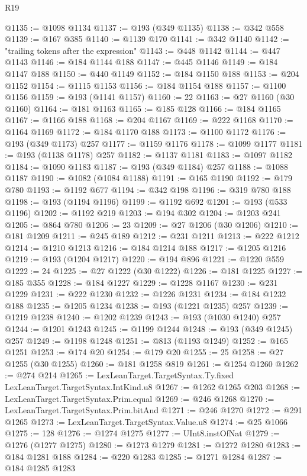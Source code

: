 \begin{lexlean}{R19}
\begin{coremodule}
@1135 := @1098 @1134
@1137 := @193 (@349 @1135)
@1138 := @342 @558
@1139 := @167 @385
@1140 := @1139 @170
@1141 := @342 @1140
@1142 := "trailing tokens after the expression"
@1143 := @448 @1142
@1144 := @447 @1143
@1146 := @184 @1144 @188
@1147 := @445 @1146
@1149 := @184 @1147 @188
@1150 := @440 @1149
@1152 := @184 @1150 @188
@1153 := @204 @1152
@1154 := @1115 @1153
@1156 := @184 @1154 @188
@1157 := @1100 @1156
@1159 := @193 (@1141 @1157)
@1160 := 22
@1163 := @27 @1160 (@30 @1160)
@1164 := @181 @1163
@1165 := @185 @128
@1166 := @184 @1165
@1167 := @1166 @188
@1168 := @204 @1167
@1169 := @222 @1168
@1170 := @1164 @1169
@1172 := @184 @1170 @188
@1173 := @1100 @1172
@1176 := @193 (@349 @1173) @257
@1177 := @1159 @1176
@1178 := @1099 @1177
@1181 := @193 (@1138 @1178) @257
@1182 := @1137 @1181
@1183 := @1097 @1182
@1184 := @1090 @1183
@1187 := @193 (@349 @1184) @257
@1188 := @1088 @1187
@1190 := @1082 (@1084 @1188)
@1191 := @165 @1190
@1192 := @179 @780
@1193 := @1192 @677
@1194 := @342 @198
@1196 := @319 @780 @188
@1198 := @193 (@1194 @1196)
@1199 := @1192 @692
@1201 := @193 (@533 @1196)
@1202 := @1192 @219
@1203 := @194 @302
@1204 := @1203 @241
@1205 := @864 @780
@1206 := 23
@1209 := @27 @1206 (@30 @1206)
@1210 := @181 @1209
@1211 := @245 @189
@1212 := @231 @1211
@1213 := @222 @1212
@1214 := @1210 @1213
@1216 := @184 @1214 @188
@1217 := @1205 @1216
@1219 := @193 (@1204 @1217)
@1220 := @194 @896
@1221 := @1220 @559
@1222 := 24
@1225 := @27 @1222 (@30 @1222)
@1226 := @181 @1225
@1227 := @185 @355
@1228 := @184 @1227
@1229 := @1228 @1167
@1230 := @231 @1229
@1231 := @222 @1230
@1232 := @1226 @1231
@1234 := @184 @1232 @188
@1235 := @1205 @1234
@1238 := @193 (@1221 @1235) @257
@1239 := @1219 @1238
@1240 := @1202 @1239
@1243 := @193 (@1030 @1240) @257
@1244 := @1201 @1243
@1245 := @1199 @1244
@1248 := @193 (@349 @1245) @257
@1249 := @1198 @1248
@1251 := @813 (@1193 @1249)
@1252 := @165 @1251
@1253 := @174 @20
@1254 := @179 @20
@1255 := 25
@1258 := @27 @1255 (@30 @1255)
@1260 := @181 @1258 @819
@1261 := @1254 @1260
@1262 := @274 @214
@1265 := LexLeanTarget.TargetSyntax.Ty.fixed LexLeanTarget.TargetSyntax.IntKind.u8
@1267 := @1262 @1265 @203
@1268 := LexLeanTarget.TargetSyntax.Prim.equal
@1269 := @246 @1268
@1270 := LexLeanTarget.TargetSyntax.Prim.bitAnd
@1271 := @246 @1270
@1272 := @291 @1265
@1273 := LexLeanTarget.TargetSyntax.Value.u8
@1274 := @25 @1066
@1275 := 128
@1276 := @1274 @1275
@1277 := UInt8.instOfNat
@1279 := @1276 (@1277 @1275)
@1280 := @1273 @1279
@1281 := @1272 @1280
@1283 := @184 @1281 @188
@1284 := @220 @1283
@1285 := @1271 @1284
@1287 := @184 @1285 @1283

\end{coremodule}
\end{lexlean}
